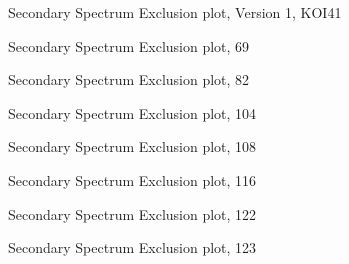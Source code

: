 \documentclass{emulateapj}
\begin{document}
\clearpage






\begin{figure}
\caption{Secondary Spectrum Exclusion plot, Version 1, KOI41}
\label{fig:koi41_ssep}
\end{figure}

\begin{figure}
\caption{Secondary Spectrum Exclusion plot, 69}
\label{fig:koi69_ssep}
\end{figure}

\begin{figure}
\caption{Secondary Spectrum Exclusion plot, 82}
\label{fig:koi82_ssep}
\end{figure}

\begin{figure}
\caption{Secondary Spectrum Exclusion plot, 104}
\label{fig:koi104_ssep}
\end{figure}

\begin{figure}
\caption{Secondary Spectrum Exclusion plot, 108}
\label{fig:koi108_ssep}
\end{figure}

\begin{figure}
\caption{Secondary Spectrum Exclusion plot, 116}
\label{fig:koi116_ssep}
\end{figure}

\begin{figure}
\caption{Secondary Spectrum Exclusion plot, 122}
\label{fig:koi122_ssep}
\end{figure}

\begin{figure}
\caption{Secondary Spectrum Exclusion plot, 123}
\label{fig:koi123_ssep}
\end{figure}
\end{document}
